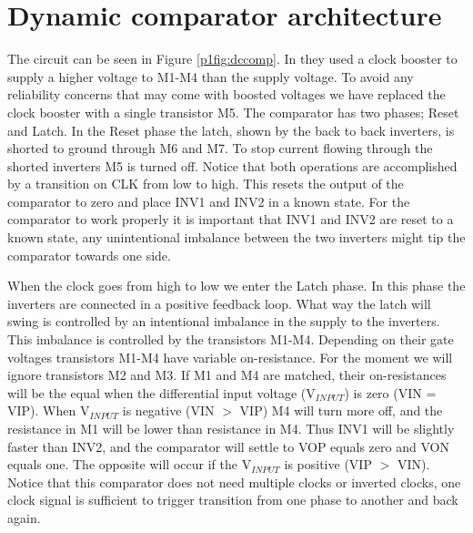 \section{Dynamic comparator architecture}

The circuit can be seen in Figure \ref{p1fig:dccomp}. In \cite{lofti03}
they used a clock booster to supply a higher voltage to M1-M4 than
the supply voltage. To avoid any reliability concerns that may come
with boosted voltages we have replaced the clock booster with a single
transistor M5. The comparator has two phases; Reset and Latch. In the
Reset phase the latch, shown by the back to back inverters, is shorted
to ground through M6 and M7. To stop current flowing through the
shorted inverters M5 is turned off. Notice that both operations are
accomplished by a transition on CLK from low to high. This resets the
output of the comparator to zero and place INV1 and INV2 in a known
state. For the comparator to work properly it is important that INV1
and INV2 are reset to a known state, any unintentional imbalance
between the two inverters might tip the comparator towards one side.
 
When the clock goes from high to low we enter the Latch phase. In this
phase the inverters are connected in a positive feedback loop. What way
the latch will swing is controlled by an intentional imbalance in the
supply to the inverters. This imbalance is controlled by the
transistors M1-M4. Depending on their gate voltages transistors M1-M4
have variable on-resistance. For the moment we will ignore transistors
M2 and M3. If M1 and M4 are matched, their on-resistances will be the
equal when the differential input voltage (V$_{INPUT}$) is zero (VIN =
VIP). When V$_{INPUT}$ is negative (VIN \begin{math}>\end{math} VIP) M4
will turn more off, and the resistance in M1 will be lower than
resistance in M4. Thus INV1 will be slightly faster than INV2, and the
comparator will settle to VOP equals zero and VON equals one. The
opposite will occur if the V$_{INPUT}$ is positive (VIP
\begin{math}>\end{math} VIN). Notice that this comparator does not need
multiple clocks or inverted clocks, one clock signal is sufficient to
trigger transition from one phase to another and back again.
 

